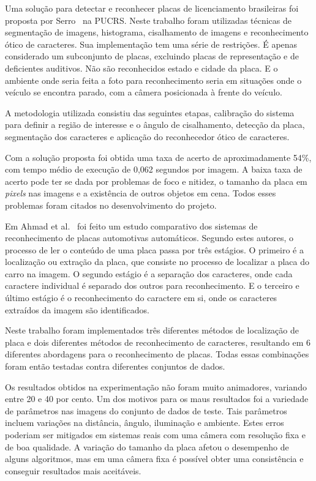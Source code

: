 Uma solução para detectar e reconhecer placas de licenciamento brasileiras foi
proposta por Serro~\cite{serro2012deteccao} na PUCRS\@. Neste trabalho foram
utilizadas técnicas de segmentação de imagens, histograma, cisalhamento de
imagens e reconhecimento ótico de caracteres. Sua implementação tem uma série de
restrições. É apenas considerado um subconjunto de placas, excluindo placas de
representação e de deficientes auditivos. Não são reconhecidos estado e cidade
da placa. E o ambiente onde seria feita a foto para reconhecimento seria em
situações onde o veículo se encontra parado, com a câmera posicionada à frente
do veículo.

A metodologia utilizada consistiu das seguintes etapas, calibração do sistema
para definir a região de interesse e o ângulo de cisalhamento, detecção da
placa, segmentação dos caracteres e aplicação do reconhecedor ótico de
caracteres.

Com a solução proposta foi obtida uma taxa de acerto de aproximadamente 54\%,
com tempo médio de execução de 0,062 segundos por imagem. A baixa taxa de acerto
pode ter se dada por problemas de foco e nitidez, o tamanho da placa em
\emph{pixels} nas imagens e a existência de outros objetos em cena. Todos esses
problemas foram citados no desenvolvimento do projeto.

Em Ahmad et al.~\cite{ahmad2015automatic} foi feito um estudo comparativo dos
sistemas de reconhecimento de placas automotivas automáticos. Segundo estes
autores, o processo de ler o conteúdo de uma placa passa por três estágios. O
primeiro é a localização ou extração da placa, que consiste no processo de
localizar a placa do carro na imagem. O segundo estágio é a separação dos
caracteres, onde cada caractere individual é separado dos outros para
reconhecimento. E o terceiro e último estágio é o reconhecimento do caractere em
si, onde os caracteres extraídos da imagem são identificados.

Neste trabalho foram implementados três diferentes métodos de localização de
placa e dois diferentes métodos de reconhecimento de caracteres, resultando em 6
diferentes abordagens para o reconhecimento de placas. Todas essas combinações
foram então testadas contra diferentes conjuntos de dados.

Os resultados obtidos na experimentação não foram muito animadores, variando
entre 20 e 40 por cento. Um dos motivos para os maus resultados foi a variedade
de parâmetros nas imagens do conjunto de dados de teste. Tais parâmetros incluem
variações na distância, ângulo, iluminação e ambiente. Estes erros poderiam ser
mitigados em sistemas reais com uma câmera com resolução fixa e de boa
qualidade. A variação do tamanho da placa afetou o desempenho de alguns
algoritmos, mas em uma câmera fixa é possível obter uma consistência e conseguir
resultados mais aceitáveis.

